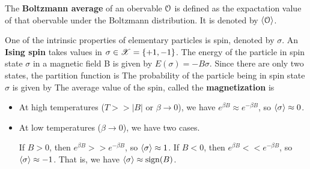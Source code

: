 \documentclass[letterpaper,english,10pt]{article}
\begin{document}
\begin{defn}
The \textbf{Boltzmann average} of an obervable $\mathcal{O}$ is defined as the expactation value of that obervable under the Boltzmann distribution. It is denoted by $\left\langle\mathcal{O}\right\rangle$.
\end{defn}
\begin{shaded*} 
\begin{exmp}
One of the intrinsic properties of elementary particles is spin, denoted by $\sigma$. An \textbf{Ising spin} takes values in $\sigma \in \mathscr{X} =\{+1, -1\}$. The energy of the particle in spin state $\sigma$ in a magnetic field B is given by $E(\sigma)=-B\sigma$. 
Since there are only two states, the partition function is 
The probability of the particle being in spin state $\sigma$ is given by 
The average value of the spin, called the \textbf{magnetization} is
\begin{itemize}
\item At high temperatures ($T>>|B|$ or $\beta \to 0$), we have $e^{\beta B} \approx e^{-\beta B}$, so $\left\langle\sigma\right\rangle \approx 0$.  
\item At low temperatures ($\beta \to 0$), we have two cases. 

If $B>0$, then $e^{\beta B} >> e^{-\beta B}$, so $\left\langle\sigma\right\rangle \approx 1$. 
If $B<0$, then $e^{\beta B} << e^{-\beta B}$, so $\left\langle\sigma\right\rangle \approx -1$. 
That is, we have $\left\langle\sigma\right\rangle \approx \operatorname{sign}(B)$. 
\end{itemize}
\end{exmp} 
\end{shaded*}
\end{document}
